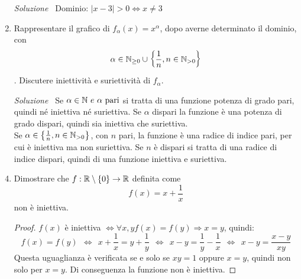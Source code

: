 \documentclass{article}
\begin{document}
\begin{enumerate}[label=\textbf{Esercizio 1.\arabic*.},itemindent=*]
    \item[\textit{\large Soluzione~}] Dominio: $|x-3|>0 \Leftrightarrow x\neq 3$
    \begin{figure}[h]
        \centering
    \end{figure}
    \item Rappresentare il grafico di $f_\alpha (x)=x^\alpha$, dopo averne determinato il dominio, con \[\alpha \in \mathbb{N}_{\geq 0} \cup \left\{\frac{1}{n}, n \in \mathbb{N}_{>0}\right\}\]. Discutere iniettività e suriettività di $f_\alpha$.
    \item[\textit{\large Soluzione~}] Se $\alpha \in \mathbb{N} ~e~ \alpha \text{ pari}$ si tratta di una funzione potenza di grado pari, quindi né iniettiva né suriettiva. Se $\alpha$ dispari la funzione è una potenza di grado dispari, quindi sia iniettiva che suriettiva.\\
    Se $\alpha \in \left\{\frac{1}{n}, n \in \mathbb{N}_{>0}\right\}$, con $n$ pari, la funzione è una radice di indice pari, per cui è iniettiva ma non suriettiva. Se $n$ è dispari si tratta di una radice di indice dispari, quindi di una funzione iniettiva e suriettiva.
    \item Dimostrare che $f:\mathbb{R}\setminus \{0\}\to \mathbb{R}$ definita come \[f(x)=x+\frac{1}{x}\] non è iniettiva.
    \begin{proof}$f(x)$ è iniettiva $\Leftrightarrow \forall x,y f(x)=f(y)\Rightarrow x=y$, quindi:
    \[f(x)=f(y)~~\Leftrightarrow~~x+\frac{1}{x}=y+\frac{1}{y}~~\Leftrightarrow~~x-y=\frac{1}{y}-\frac{1}{x}~~\Leftrightarrow~~x-y=\frac{x-y}{xy}\]
    Questa uguaglianza è verificata se e solo se $xy=1$ oppure $x=y$, quindi non solo per $x=y$. Di conseguenza la funzione non è iniettiva.\end{proof}
\end{enumerate}
\end{document}
